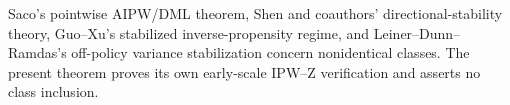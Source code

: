 Saco's pointwise AIPW/DML theorem, Shen and coauthors' directional-stability theory, Guo--Xu's stabilized inverse-propensity regime, and Leiner--Dunn--Ramdas's off-policy variance stabilization concern nonidentical classes. The present theorem proves its own early-scale IPW--Z verification and asserts no class inclusion.
